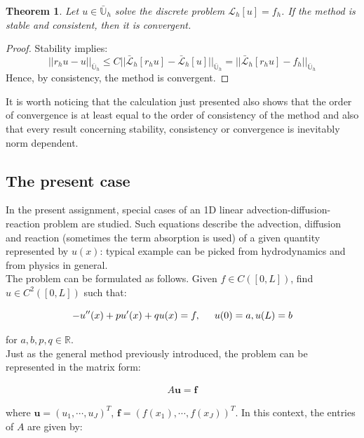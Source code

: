 \documentclass[11pt]{article}
\theoremstyle{theorem}
\newtheorem{theorem}{Theorem}
\theoremstyle{definition}
\begin{document}
\begin{theorem}
	\label{thm:stab-conv}
	Let $u\in\bar{\mathbb{U}}_h$ solve the discrete problem $\mathcal{L}_h[u]=f_h$. If the method is stable and consistent, then it is convergent. 
\end{theorem}
\begin{proof}
	Stability implies:
	$$||r_hu-u||_{{\bar{\mathbb{U}}}_h}\le C ||\bar{\mathcal{L}}_h[r_hu]-\bar{\mathcal{L}}_h[u]||_{{\bar{\mathbb{U}}}_h}=||\bar{\mathcal{L}}_h[r_hu]-f_h||_{{\bar{\mathbb{U}}}_h}$$
	Hence, by consistency, the method is convergent.
\end{proof}

It is worth noticing that the calculation just presented also shows that the order of convergence is at least equal to the order of consistency of the method and also that every result concerning stability, consistency or convergence is inevitably norm dependent.\\

\subsection{The present case}
\label{subsec:the-present-case}
In the present assignment, special cases of an 1D linear advection-diffusion-reaction problem are studied. Such equations describe the advection, diffusion and reaction (sometimes the term absorption is used) of a given quantity represented by $u(x)$: typical example can be picked from hydrodynamics and from physics in general.\\
The problem can be formulated as follows. Given $f\in C([0, L])$, find $u\in C^2([0, L])$ such that:

\begin{equation}
	\label{eqn:ass-prob}
	-u''(x)+ pu'(x)+qu(x)= f,\hspace{5mm}u(0)=a, u(L)=b
\end{equation}

for $a, b, p, q\in\mathbb{R}$. \\

Just as the general method previously introduced, the problem can be represented in the matrix form:

\begin{align}
	\label{eqn:matrix-form}
	A\mathbf{u}=\mathbf{f}
\end{align}

where $\mathbf{u}=(u_1, \cdots, u_J)^{T}$, $\mathbf{f}=(f(x_1),\cdots , f(x_J))^{T}$. In this context, the entries of $A$ are given by:
\end{document}

